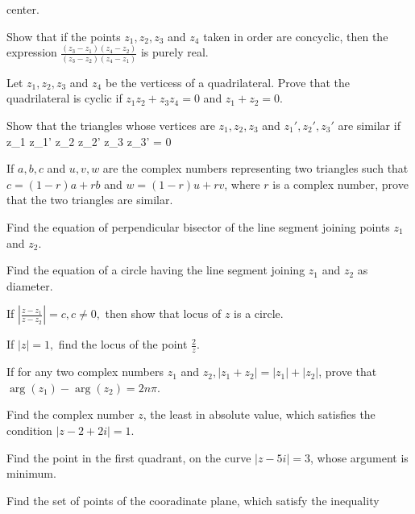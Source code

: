   center.
\item Show that if the points $z_1, z_2, z_3$ and $z_4$ taken in order are concyclic, then the expression $\frac{(z_3 - z_1)(z_4 -
  z_2)}{(z_3 - z_2)(z_4 - z_1)}$ is purely real.
\item Let $z_1, z_2, z_3$ and $z_4$ be the verticess of a quadrilateral. Prove that the quadrilateral is cyclic if $z_1z_2 + z_3z_4
  = 0$ and $z_1 + z_2 =0$.
\item Show that the triangles whose vertices are $z_1, z_2, z_3$ and $z_1', z_2', z_3'$ are similar if \startformula \startdeterminant
  \NC z_1 \NC z_1' \NR\NC z_2 \NC z_2' \NR\NC z_3 \NC z_3' \NR\stopdeterminant = 0\stopformula
\item If $a, b, c$ and $u, v, w$ are the complex numbers representing two triangles such that $c = (1 - r)a
  + rb$ and $w = (1 - r)u
  + rv$, where $r$ is a complex number, prove that the two triangles are similar.
\item Find the equation of perpendicular bisector of the line segment joining points $z_1$ and $z_2$.
\item Find the equation of a circle having the line segment joining $z_1$ and $z_2$ as diameter.
\item If $\left|\frac{z - z_1}{z - z_2}\right| = c, c\neq 0,$ then show that locus of $z$ is a circle.
\item If $|z| = 1,$ find the locus of the point $\frac{2}{z}$.
\item If for any two complex numbers $z_1$ and $z_2, |z_1 + z_2| = |z_1| + |z_2|$, prove that $\arg(z_1) - \arg(z_2) = 2n\pi$.
\item Find the complex number $z$, the least in absolute value, which satisfies the condition $|z - 2 + 2i| = 1$.
\item Find the point in the first quadrant, on the curve $|z - 5i| = 3$, whose argument is minimum.
\item Find the set of points of the cooradinate plane, which satisfy the inequality

